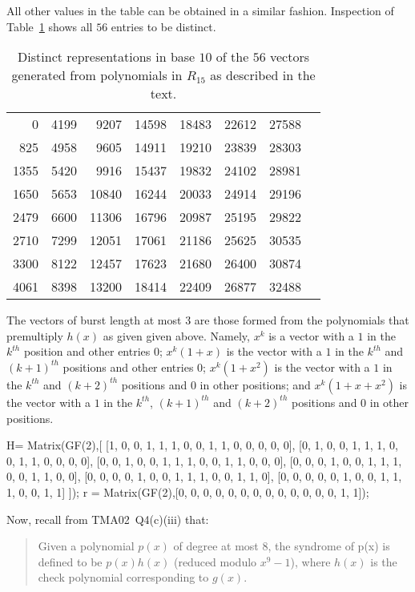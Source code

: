 All other values in the table can be obtained in a similar fashion. Inspection of Table~\ref{tab: distinct} shows all $56$ entries to be distinct.

\begin{table}[!htp]\centering
\begin{tabular}{rrrrrrrr}\toprule
0	&	4199	&	9207	&	14598	&	18483	&	22612	&	27588	\\
825	&	4958	&	9605	&	14911	&	19210	&	23839	&	28303	\\
1355	&	5420	&	9916	&	15437	&	19832	&	24102	&	28981	\\
1650	&	5653	&	10840	&	16244	&	20033	&	24914	&	29196	\\
2479	&	6600	&	11306	&	16796	&	20987	&	25195	&	29822	\\
2710	&	7299	&	12051	&	17061	&	21186	&	25625	&	30535	\\
3300	&	8122	&	12457	&	17623	&	21680	&	\color{blue}26400\color{black}	& 	30874	\\
4061	&	8398	&	13200	&	18414	&	22409	&	26877	&	32488	\\
\bottomrule
\end{tabular}
\caption{Distinct representations in base $10$ of the $56$ vectors generated from polynomials in $R_{15}$ as described in the text.}\label{tab: distinct}
\end{table}
The vectors of burst length at most $3$ are those formed from the polynomials that premultiply $h(x)$ as given given above. Namely, $x^k$ is a vector with a $1$ in the $k^{th}$ position and other entries $0$; $x^k(1+x)$ is the vector with a $1$ in the $k^{th}$ and $(k+1)^{th}$ positions and other entries 0; $x^k(1+x^2)$ is the vector with a $1$ in the $k^{th}$ and $(k+2)^{th}$ positions and $0$ in other positions; and $x^k(1+x+x^2)$ is the vector with a $1$ in the $k^{th}$, $(k+1)^{th}$ and $(k+2)^{th}$ positions and $0$ in other positions. 
\begin{sagesilent}
	H= Matrix(GF(2),[
	   [1, 0, 0, 1, 1, 1, 0, 0, 1, 1, 0, 0, 0, 0, 0],
	   [0, 1, 0, 0, 1, 1, 1, 0, 0, 1, 1, 0, 0, 0, 0],
	   [0, 0, 1, 0, 0, 1, 1, 1, 0, 0, 1, 1, 0, 0, 0],
	   [0, 0, 0, 1, 0, 0, 1, 1, 1, 0, 0, 1, 1, 0, 0],
	   [0, 0, 0, 0, 1, 0, 0, 1, 1, 1, 0, 0, 1, 1, 0],
	   [0, 0, 0, 0, 0, 1, 0, 0, 1, 1, 1, 0, 0, 1, 1]
	]);
	r = Matrix(GF(2),[0, 0, 0, 0, 0, 0, 0, 0, 0, 0, 0, 0, 0, 1, 1]);
\end{sagesilent}

Now, recall from TMA02~Q4(c)(iii) that:
\begin{quote}
Given a polynomial $p(x)$ of degree at most $8$, the syndrome of
p(x) is defined to be $p(x)h(x)$ (reduced modulo $x^9 - 1$), 
where $h(x)$ is the check polynomial corresponding to $g(x)$.
\end{quote}


